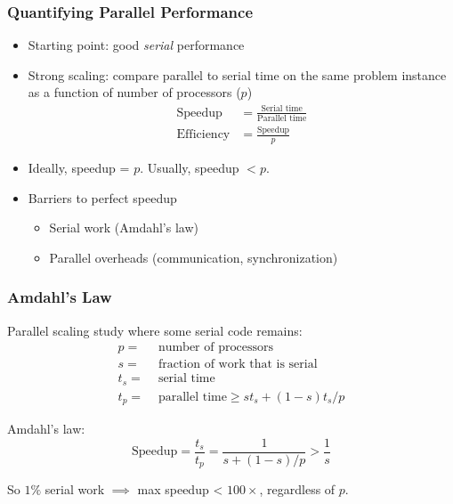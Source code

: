 \documentclass{beamer}
\begin{document}
\begin{frame}
  \frametitle{Quantifying Parallel Performance}
  
  \begin{itemize}
  \item Starting point: good {\em serial} performance
  \item Strong scaling: compare parallel to serial time on the same
    problem instance as a function of number of processors ($p$)
    \begin{align*}
      \mbox{Speedup} &= \frac{\mbox{Serial time}}{\mbox{Parallel time}} \\[2mm]
      \mbox{Efficiency} &= \frac{\mbox{Speedup}}{p}
    \end{align*}
  \item
    Ideally, speedup = $p$.  
    Usually, speedup $ < p$.
  \item Barriers to perfect speedup
    \begin{itemize}
    \item Serial work (Amdahl's law)
    \item Parallel overheads (communication, synchronization)
    \end{itemize}
  \end{itemize}
\end{frame}


\begin{frame}
  \frametitle{Amdahl's Law}

  Parallel scaling study where some serial code remains:
  \begin{align*}
    p = & \mbox{ number of processors} \\
    s = & \mbox{ fraction of work that is serial} \\
    t_s = & \mbox{ serial time} \\
    t_p = & \mbox{ parallel time} \geq s t_s + (1-s) t_s / p
  \end{align*}

  \vspace{2mm}
  Amdahl's law:
  \[
    \mbox{Speedup} = 
      \frac{t_s}{t_p} = \frac{1}{s + (1-s) / p} > \frac{1}{s}
  \]

  \vspace{5mm}
  So $1\%$ serial work $\implies$ max speedup < $100 \times$,
  regardless of $p$.
\end{frame}
\end{document}
